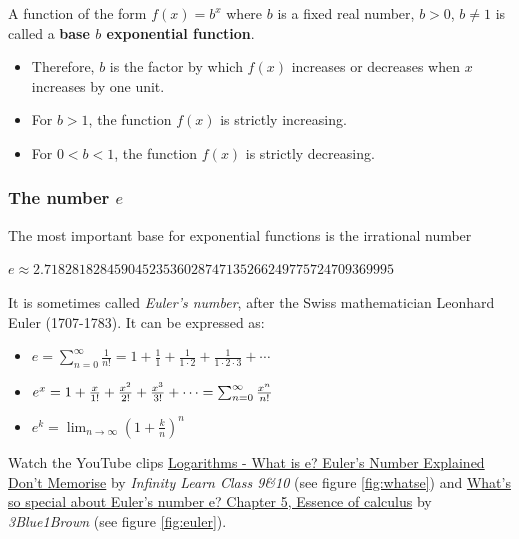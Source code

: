 \documentclass[
  12pt,
  oneside]{book}
\providecommand{\tightlist}{%
  \setlength{\itemsep}{0pt}\setlength{\parskip}{0pt}}
\theoremstyle{definition}
\theoremstyle{definition}
\theoremstyle{definition}
\theoremstyle{definition}
\theoremstyle{remark}
\begin{document}
A function of the form \(f(x) = b^{x}\) where \(b\) is a fixed real number, \(b > 0\), \(b \neq 1\) is called a \textbf{base \(b\) exponential function}.

\begin{itemize}
\tightlist
\item
  Therefore, \(b\) is the factor by which \(f(x)\) increases or decreases when \(x\) increases by one unit.
\item
  For \(b > 1\), the function \(f(x)\) is strictly increasing.
\item
  For \(0 < b < 1\), the function \(f(x)\) is strictly decreasing.
\end{itemize}

\hypertarget{the-number-e}{%
\subsubsection{\texorpdfstring{The number \(e\)}{The number e}}\label{the-number-e}}

The most important base for exponential functions is the irrational number

\(e \approx 2.71828182845904523536028747135266249775724709369995\)

It is sometimes called \emph{Euler's number}, after the Swiss mathematician Leonhard Euler (1707-1783).
It can be expressed as:

\begin{itemize}
\item
  \(e = \sum \limits _{n=0}^{\infty }{\frac {1}{n!}} = 1+{\frac {1}{1}}+{\frac {1}{1\cdot 2}}+{\frac {1}{1\cdot 2\cdot 3}}+\cdots\)
\item
  \(e^{x} = 1+{x \over 1!}+{x^{2} \over 2!}+{x^{3} \over 3!}+\cdots = \sum _{n=0}^{\infty }{\frac {x^{n}}{n!}}\)
\item
  \(e^k = \lim _{n\to \infty }\left(1+{\frac {k}{n}}\right)^{n}\)
\end{itemize}

Watch the YouTube clips \href{https://youtu.be/_-x90wGBD8U}{Logarithms - What is e? \textbar{} Euler's Number Explained \textbar{} Don't Memorise} by \emph{Infinity Learn Class 9\&10} (see figure \ref{fig:whatse}) and \href{https://youtu.be/m2MIpDrF7Es}{What's so special about Euler's number e? \textbar{} Chapter 5, Essence of calculus} by \emph{3Blue1Brown} (see figure \ref{fig:euler}).
\end{document}

